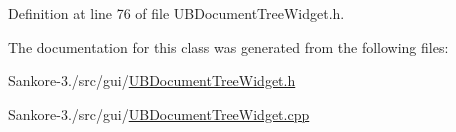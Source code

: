Definition at line 76 of file U\-B\-Document\-Tree\-Widget.\-h.



The documentation for this class was generated from the following files\-:\begin{DoxyCompactItemize}
\item 
Sankore-\/3./src/gui/\hyperlink{_u_b_document_tree_widget_8h}{U\-B\-Document\-Tree\-Widget.\-h}\item 
Sankore-\/3./src/gui/\hyperlink{_u_b_document_tree_widget_8cpp}{U\-B\-Document\-Tree\-Widget.\-cpp}\end{DoxyCompactItemize}

